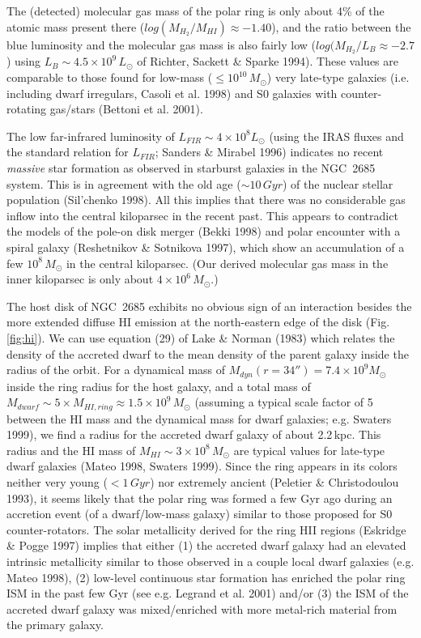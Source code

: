 \documentclass{aastex}
\newcommand{\solar}{L_{\odot}}
\newcommand{\solm}{M_{\odot}}
\begin{document}
The (detected) molecular gas mass of the polar ring is only about 4\%
of the atomic mass present there ($log(M_{H_2}/M_{HI})\approx -1.40$), and
the ratio between the blue luminosity and the molecular gas mass
is also fairly low ($log(M_{H_2}/L_{B}\approx-2.7$) using
$L_{B}\sim4.5\times10^9\,\solar$ of Richter, Sackett \& Sparke
1994). These values are comparable to those found for low-mass ($\leq
10^{10}\,\solm$) very late-type galaxies (i.e. including dwarf
irregulars, Casoli et al. 1998) and S0 galaxies with counter-rotating
gas/stars (Bettoni et al. 2001).

The low far-infrared luminosity of $L_{FIR}\sim 4\times10^8\solar$
(using the IRAS fluxes and the standard relation for $L_{FIR}$;
Sanders \& Mirabel 1996) indicates no recent {\it massive} star
formation as observed in starburst galaxies in the NGC~2685
system. This is in agreement with the old age ($\sim 10\,Gyr$) of the
nuclear stellar population (Sil'chenko 1998). All this implies that
there was no considerable gas inflow into the central kiloparsec in
the recent past. This appears to contradict the models of the pole-on
disk merger (Bekki 1998) and polar encounter with a spiral galaxy
(Reshetnikov \& Sotnikova 1997), which show an accumulation of a few
$10^8\,\solm$ in the central kiloparsec. (Our derived molecular gas
mass in the inner kiloparsec is only about $4\times10^6\,\solm$.)

The host disk of NGC~2685 exhibits no obvious sign of an interaction
besides the more extended diffuse HI emission at the north-eastern
edge of the disk (Fig. \ref{fig:hi}). We can use equation (29) of Lake
\& Norman (1983) which relates the density of the accreted dwarf to
the mean density of the parent galaxy inside the radius of the
orbit. For a dynamical mass of $M_{dyn} (r=34'') = 7.4 \times 10^9
M_{\odot}$ inside the ring radius for the host galaxy, and a total
mass of $M_{dwarf}\sim 5\times M_{HI,ring}\approx1.5\times10^9\,\solm$
(assuming a typical scale factor of 5 between the HI mass
and the dynamical mass for dwarf galaxies; e.g. Swaters
1999), we find a radius for the accreted dwarf galaxy of about
2.2\,kpc. This radius and the HI mass of
$M_{HI}\sim3\times10^8\,\solm$ are typical values for late-type dwarf
galaxies (Mateo 1998, Swaters 1999).  Since the ring appears in its
colors neither very young ($< 1\,Gyr$) nor extremely ancient (Peletier
\& Christodoulou 1993), it seems likely that the polar ring was formed
a few Gyr ago during an accretion event (of a dwarf/low-mass galaxy)
similar to those proposed for S0 counter-rotators. The solar
metallicity derived for the ring HII regions (Eskridge \& Pogge 1997)
implies that either (1) the accreted dwarf galaxy had an elevated
intrinsic metallicity similar to those observed in a couple local
dwarf galaxies (e.g. Mateo 1998), (2) low-level continuous star
formation has enriched the polar ring ISM in the past few Gyr (see
e.g. Legrand et al. 2001) and/or (3) the ISM of the accreted dwarf
galaxy was mixed/enriched with more metal-rich material from the
primary galaxy.
\end{document}

